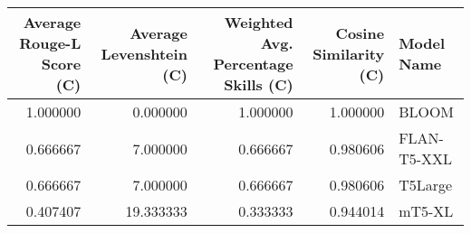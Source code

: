 \begin{tabular}{rrrrl}
\toprule
Average Rouge-L Score (C) & Average Levenshtein (C) & Weighted Avg. Percentage Skills (C) & Cosine Similarity (C) & Model Name \\
\midrule
1.000000 & 0.000000 & 1.000000 & 1.000000 & BLOOM \\
0.666667 & 7.000000 & 0.666667 & 0.980606 & FLAN-T5-XXL \\
0.666667 & 7.000000 & 0.666667 & 0.980606 & T5Large \\
0.407407 & 19.333333 & 0.333333 & 0.944014 & mT5-XL \\
\bottomrule
\end{tabular}

